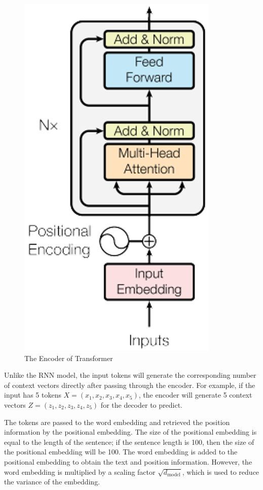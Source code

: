 \begin{figure}[h]
	\centering
	\includegraphics[scale=0.7]{../images/transformer-encoder.png}
    \caption{The Encoder of Transformer}
	\label{fig:transformer_encoder}
\end{figure}

Unlike the RNN model, the input tokens will generate the corresponding number of context vectors directly after passing through the encoder. For example, if the input has 5 tokens $X = (x_1, x_2, x_3, x_4, x_5)$, the encoder will generate 5 context vectors $Z = (z_1, z_2, z_3, z_4, z_5)$ for the decoder to predict.

The tokens are passed to the word embedding and retrieved the position information by the positional embedding. The size of the positional embedding is equal to the length of the sentence; if the sentence length is 100, then the size of the positional embedding will be 100. The word embedding is added to the positional embedding to obtain the text and position information. However, the word embedding is multiplied by a scaling factor $\sqrt{d_\text{model}}$, which is used to reduce the variance of the embedding.

